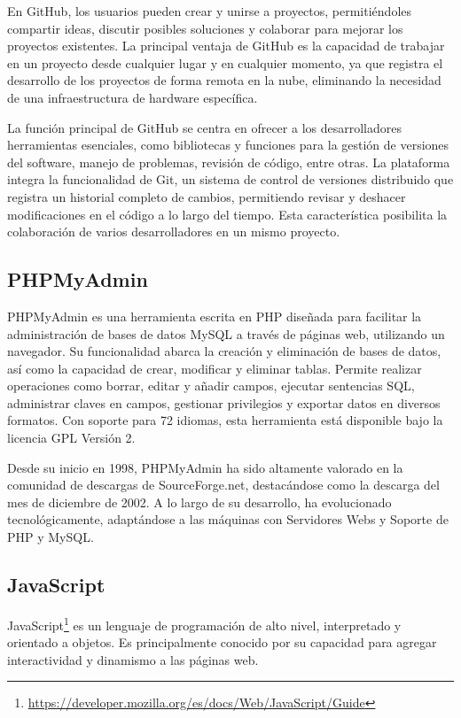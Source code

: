 \documentclass[a4paper, 12pt]{book}
\begin{document}
En GitHub, los usuarios pueden crear y unirse a proyectos, permitiéndoles compartir ideas, discutir posibles soluciones y colaborar para mejorar los proyectos existentes. La principal ventaja de GitHub es la capacidad de trabajar en un proyecto desde cualquier lugar y en cualquier momento, ya que registra el desarrollo de los proyectos de forma remota en la nube, eliminando la necesidad de una infraestructura de hardware específica.

La función principal de GitHub se centra en ofrecer a los desarrolladores herramientas esenciales, como bibliotecas y funciones para la gestión de versiones del software, manejo de problemas, revisión de código, entre otras. La plataforma integra la funcionalidad de Git, un sistema de control de versiones distribuido que registra un historial completo de cambios, permitiendo revisar y deshacer modificaciones en el código a lo largo del tiempo. Esta característica posibilita la colaboración de varios desarrolladores en un mismo proyecto.

\subsection{PHPMyAdmin}
\label{subsec:phpmyadmin}

PHPMyAdmin es una herramienta escrita en PHP diseñada para facilitar la administración de bases de datos MySQL a través de páginas web, 
utilizando un navegador. Su funcionalidad abarca la creación y eliminación de bases de datos, así como la capacidad de crear, modificar 
y eliminar tablas. Permite realizar operaciones como borrar, editar y añadir campos, ejecutar sentencias SQL, administrar claves en campos, 
gestionar privilegios y exportar datos en diversos formatos. Con soporte para 72 idiomas, esta herramienta está disponible bajo la licencia 
GPL Versión 2.

Desde su inicio en 1998, PHPMyAdmin ha sido altamente valorado en la comunidad de descargas de SourceForge.net, destacándose como la 
descarga del mes de diciembre de 2002. A lo largo de su desarrollo, ha evolucionado tecnológicamente, adaptándose a las máquinas con 
Servidores Webs y Soporte de PHP y MySQL.

\subsection{JavaScript}
\label{subsec:JavaScript}
JavaScript\footnote{\url{https://developer.mozilla.org/es/docs/Web/JavaScript/Guide}} es un lenguaje de programación de alto nivel, interpretado y orientado a objetos. Es principalmente conocido por su capacidad para agregar interactividad y dinamismo a las páginas web. 
\end{document}

